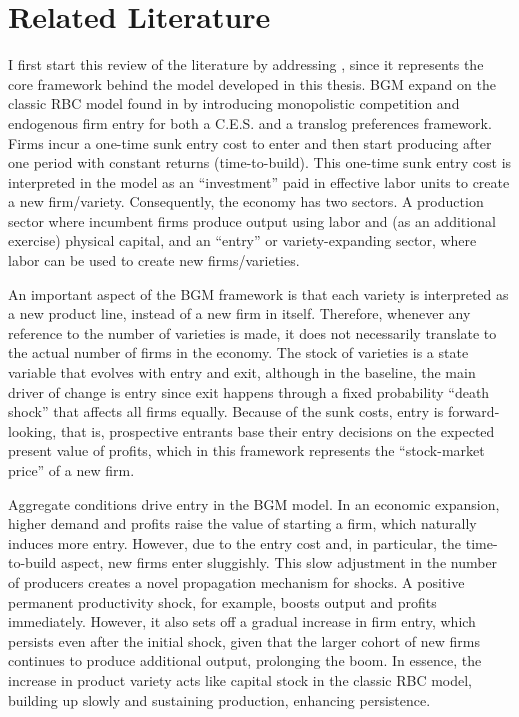 \documentclass[a4paper,12pt]{article} %
\numberwithin{equation}{section} %
\numberwithin{figure}{section}
\numberwithin{table}{section}
\begin{document}
\section{Related Literature}
\label{sec:literature}



I first start this review of the literature by addressing \textcite{bilbiie2012endogenous}, since it represents the core framework behind the model developed in this thesis. 
BGM expand on the classic RBC model found in \textcite{campbell1994inspecting} by introducing monopolistic competition and endogenous firm entry for both a C.E.S. and a translog preferences framework. 
Firms incur a one-time sunk entry cost to enter and then start producing after one period with constant returns (time-to-build). 
This one-time sunk entry cost is interpreted in the model as an ``investment'' paid in effective labor units to create a new firm/variety. Consequently, the economy has two sectors. 
A production sector where incumbent firms produce output using labor and (as an additional exercise) physical capital, and an ``entry'' or variety-expanding sector, where labor can be used to create new firms/varieties. 

An important aspect of the BGM framework is that each variety is interpreted as a new product line, instead of a new firm in itself. 
Therefore, whenever any reference to the number of varieties is made, it does not necessarily translate to the actual number of firms in the economy. 
The stock of varieties is a state variable that evolves with entry and exit, although in the baseline, the main driver of change is entry 
since exit happens through a fixed probability ``death shock'' that affects all firms equally. Because of the sunk costs, entry is forward-looking,
that is, prospective entrants base their entry decisions on the expected present value of profits, which in this framework represents the ``stock-market price'' of a new firm. 

Aggregate conditions drive entry in the BGM model. In an economic expansion, higher demand and profits raise the value of starting a firm, which naturally induces more entry. 
However, due to the entry cost and, in particular, the time-to-build aspect, new firms enter sluggishly. This slow adjustment in the number of producers creates a novel 
propagation mechanism for shocks. A positive permanent productivity shock, for example, boosts output and profits immediately. However, it also sets off a gradual increase in firm entry, 
which persists even after the initial shock, given that the larger cohort of new firms continues to produce additional output, prolonging the boom. In essence, the increase in 
product variety acts like capital stock in the classic RBC model, building up slowly and sustaining production, enhancing persistence.
\end{document}
